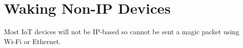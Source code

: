 
\section{Waking Non-IP Devices}

Most IoT devices will not be IP-based so cannot be sent a magic packet using Wi-Fi or Ethernet.